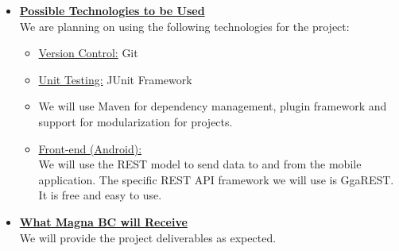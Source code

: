 \documentclass[a4paper,12pt]{article}
\begin{document}
\begin{itemize}
\newpage
\item {\large \underline{\textbf{Possible Technologies to be Used}}}\\[0.2cm]
We are planning on using the following technologies for the project:
	\begin{itemize}
		\item \underline {Version Control:} Git
		\\
		\item  \underline{Unit Testing:} JUnit Framework
		\\
		\item We will use Maven for dependency management, plugin framework and support for modularization for 				projects.
		\\
		\item \underline{Front-end (Android):}
		\\[0.2cm]
		 We will use the REST model to send data to and from the mobile application.  The specific REST API framework we 			will use is GgaREST. It is free and easy to use.
	\end{itemize}

\bigskip
 \item {\large \underline{\textbf{What Magna BC will Receive}}}\\[0.2cm]
We will provide the project deliverables as expected. 
\end{itemize}
\end{document}
